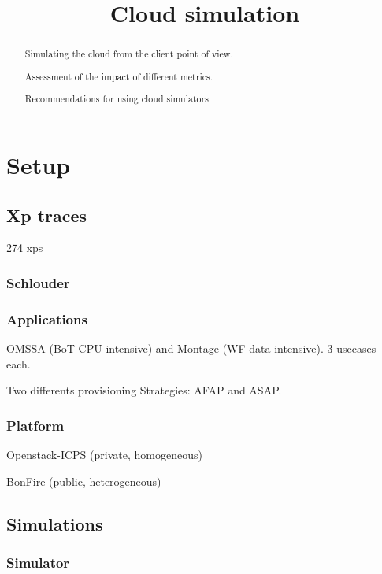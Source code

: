 \documentclass[a4paper,10pt]{article}
\title{Cloud simulation}
\author{}
\begin{document}
\maketitle

\begin{abstract}

Simulating the cloud from the client point of view.

Assessment of the impact of different metrics.

Recommendations for using cloud simulators.


\end{abstract}


\section{Setup}

\subsection{Xp traces}

274 xps

\subsubsection{Schlouder}


\subsubsection{Applications}

OMSSA (BoT CPU-intensive) and Montage (WF data-intensive). 3 usecases each.

Two differents provisioning Strategies: AFAP and ASAP.

\subsubsection{Platform}

Openstack-ICPS (private, homogeneous) 

BonFire (public, heterogeneous)


\subsection{Simulations}

\subsubsection{Simulator}
\end{document}
